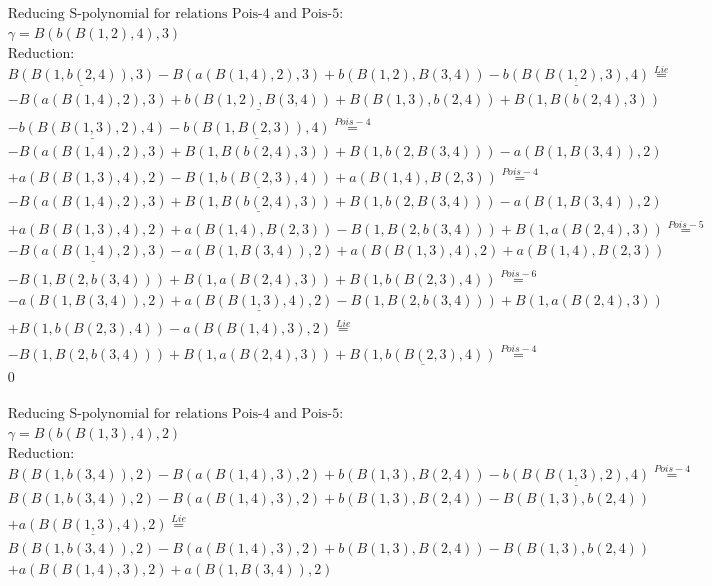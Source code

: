 \documentclass[11pt]{amsart}
\begin{document}
\begin{align*} 
& \text{Reducing S-polynomial for relations Pois-4 and Pois-5:} \\ 
& \gamma = B(b(B(1,2),4),3) \\ 
& \text{Reduction}: \\&\underline{B(B(1,b(2,4)),3)} - B(a(B(1,4),2),3) + b(B(1,2),B(3,4)) - \underline{b(B(B(1,2),3),4)} \stackrel{ Lie }{=}  \\ 
& - B(a(B(1,4),2),3) + \underline{b(B(1,2),B(3,4))} + B(B(1,3),b(2,4)) + B(1,B(b(2,4),3))\\ 
 &  - \underline{b(B(B(1,3),2),4)} - \underline{b(B(1,B(2,3)),4)} \stackrel{ Pois-4 }{=}  \\ 
& - B(a(B(1,4),2),3) + B(1,B(b(2,4),3)) + B(1,b(2,B(3,4))) - a(B(1,B(3,4)),2)\\ 
 &  + a(B(B(1,3),4),2) - \underline{B(1,b(B(2,3),4))} + a(B(1,4),B(2,3)) \stackrel{ Pois-4 }{=}  \\ 
& - B(a(B(1,4),2),3) + \underline{B(1,B(b(2,4),3))} + B(1,b(2,B(3,4))) - a(B(1,B(3,4)),2)\\ 
 &  + a(B(B(1,3),4),2) + a(B(1,4),B(2,3)) - B(1,B(2,b(3,4))) + B(1,a(B(2,4),3)) \stackrel{ Pois-5 }{=}  \\ 
& - \underline{B(a(B(1,4),2),3)} - a(B(1,B(3,4)),2) + a(B(B(1,3),4),2) + a(B(1,4),B(2,3))\\ 
 &  - B(1,B(2,b(3,4))) + B(1,a(B(2,4),3)) + B(1,b(B(2,3),4)) \stackrel{ Pois-6 }{=}  \\ 
& - a(B(1,B(3,4)),2) + \underline{a(B(B(1,3),4),2)} - B(1,B(2,b(3,4))) + B(1,a(B(2,4),3))\\ 
 &  + B(1,b(B(2,3),4)) - a(B(B(1,4),3),2) \stackrel{ Lie }{=}  \\ 
& - B(1,B(2,b(3,4))) + B(1,a(B(2,4),3)) + \underline{B(1,b(B(2,3),4))} \stackrel{ Pois-4 }{=}  \\ 
&0\\ 
\end{align*} 
 
\begin{align*} 
& \text{Reducing S-polynomial for relations Pois-4 and Pois-5:} \\ 
& \gamma = B(b(B(1,3),4),2) \\ 
& \text{Reduction}: \\&B(B(1,b(3,4)),2) - B(a(B(1,4),3),2) + b(B(1,3),B(2,4)) - \underline{b(B(B(1,3),2),4)} \stackrel{ Pois-4 }{=}  \\ 
&B(B(1,b(3,4)),2) - B(a(B(1,4),3),2) + b(B(1,3),B(2,4)) - B(B(1,3),b(2,4))\\ 
 &  + \underline{a(B(B(1,3),4),2)} \stackrel{ Lie }{=}  \\ 
&B(B(1,b(3,4)),2) - B(a(B(1,4),3),2) + b(B(1,3),B(2,4)) - B(B(1,3),b(2,4))\\ 
 &  + a(B(B(1,4),3),2) + a(B(1,B(3,4)),2)\\ 
\end{align*} 
 
\end{document}
